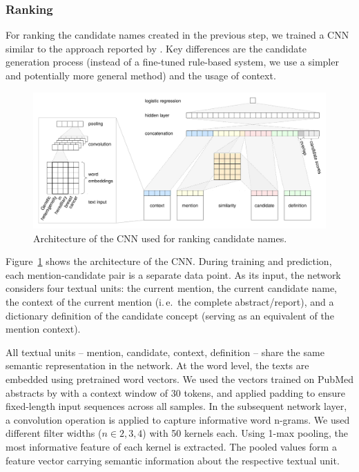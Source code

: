 \documentclass{bioinfo}
\newcommand{\ie}{i.\,e.\ }
\begin{document}
\subsubsection{Ranking}
\label{ssub:ranking}

For ranking the candidate names created in the previous step, we trained a CNN similar to the approach reported by \cite{lihaodi-et-al:2017}.
Key differences are the candidate generation process (instead of a fine-tuned rule-based system, we use a simpler and potentially more general method) and the usage of context.

\begin{figure}[!tpb]
\centerline{\includegraphics[width=\textwidth]{img/nn-arch.pdf}}
\caption{Architecture of the CNN used for ranking candidate names.}\label{fig:sys-arch}
\end{figure}

Figure~\ref{fig:sys-arch} shows the architecture of the CNN.
During training and prediction, each mention-candidate pair is a separate data point.
As its input, the network considers four textual units:
the current mention, the current candidate name, the context of the current mention (\ie the complete abstract/report), and a dictionary definition of the candidate concept (serving as an equivalent of the mention context).

All textual units -- mention, candidate, context, definition -- share the same semantic representation in the network.
At the word level, the texts are embedded using pretrained word vectors.
We used the vectors trained on PubMed abstracts by \cite{chiu-et-al:2016:BioNLP} with a context window of 30 tokens,  %
and applied padding to ensure fixed-length input sequences across all samples.
In the subsequent network layer, a convolution operation is applied to capture informative word n-grams.
We used different filter widths ($n \in {2,3,4}$) with 50 kernels each.
Using 1-max pooling, the most informative feature of each kernel is extracted.
The pooled values form a feature vector carrying semantic information about the respective textual unit.
\end{document}
